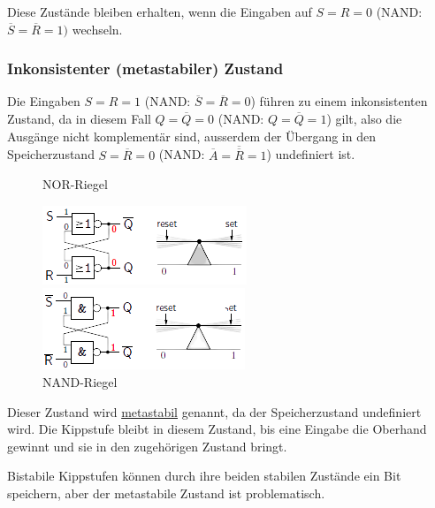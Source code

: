 \documentclass[12pt]{report}
\begin{document}
Diese Zustände bleiben erhalten, wenn die Eingaben auf $S=R=0$ (NAND: $\overline{S} = \overline{R} = 1)$ wechseln.

\subsubsection{Inkonsistenter (metastabiler) Zustand}
Die Eingaben $S=R=1$ (NAND: $\overline{S}=\overline{R}=0$) führen zu einem inkonsistenten Zustand,
da in diesem Fall $Q=\overline{Q}=0$ (NAND: $Q=\overline{Q}=1$) gilt,
also die Ausgänge nicht komplementär sind,
ausserdem der Übergang in den Speicherzustand $S=\overline{R}=0$ (NAND: $\overline{A}=\overline{\overline{R}}=1$) undefiniert ist.

\begin{figure}[H]
  \begin{minipage}[t]{0.48\textwidth}
    \caption{NOR-Riegel}
    \centering
    \includegraphics{riegel_nor_inconsistent}
  \end{minipage}
  \hfill
  \begin{minipage}[t]{0.48\textwidth}
    \caption{NAND-Riegel}
    \centering
    \includegraphics{riegel_nand_inconsistent}
  \end{minipage}
\end{figure}

Dieser Zustand wird \underline{metastabil} genannt, da der Speicherzustand undefiniert wird.
Die Kippstufe bleibt in diesem Zustand, bis eine Eingabe die Oberhand gewinnt und sie in den zugehörigen Zustand bringt.

\begin{infobox}
  Bistabile Kippstufen können durch ihre beiden stabilen Zustände ein Bit speichern,
  aber der metastabile Zustand ist problematisch.
  
\end{infobox}
\end{document}
